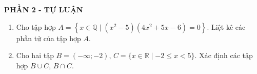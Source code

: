 \begin{center}
	\textbf{PHẦN 2 - TỰ LUẬN}
\end{center}


\begin{bt}%
	\begin{enumerate}
		\item Cho tập hợp $A=\left\{x \in \mathbb{Q} \mid\left(x^2-5\right)\left(4x^2+5x-6\right)=0\right\}$. Liệt kê các phần tử của tập hợp $A$.
		\item Cho hai tập $B=(-\infty;-2)$, $C=\{x \in \mathbb{R} \mid-2 \leq x<5\}$. Xác định các tập hợp $B \cup C$, $B \cap C$.	
	\end{enumerate}
	\loigiai{
		\begin{enumerate}
			\item Ta có
			$$\left(x^2-5\right)\left(4x^2+5x-6\right)=0 \Leftrightarrow \hoac{&x^2-5=0 \\& 4x^2+5x-6=0} \Leftrightarrow \hoac{& x=\pm \sqrt{5} \\& x=\dfrac{3}{4}\\& x=-2.}$$
			Vì $x \in \mathbb{Q}$ nên $A=\left\{-2;\dfrac{3}{4}\right\}$.
			\item Ta có $C=\left[-2;5\right)$. Khi đó
			\begin{itemize}
				\item $B \cup C=(-\infty;-2) \cup \left[-2;5\right)=(-\infty;5)$.
				\item $B \cap C=(-\infty;-2) \cap \left[-2;5\right)=\varnothing$.
			\end{itemize}			
		\end{enumerate}
}
\end{bt}
